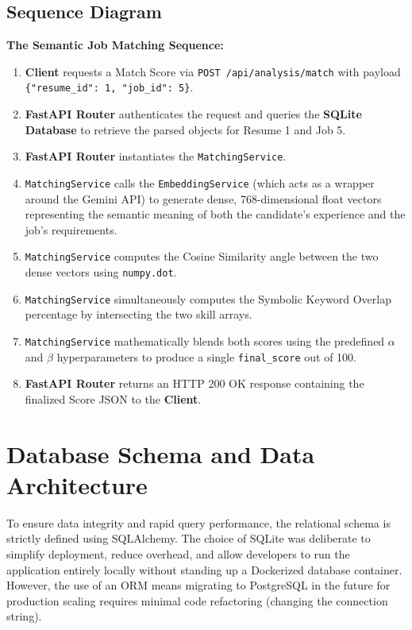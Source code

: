\documentclass[12pt,a4paper]{report}
\begin{document}
\subsection{Sequence Diagram}
\textbf{The Semantic Job Matching Sequence:}
\begin{enumerate}
    \item \textbf{Client} requests a Match Score via \texttt{POST /api/analysis/match} with payload \texttt{\{"resume\_id": 1, "job\_id": 5\}}.
    \item \textbf{FastAPI Router} authenticates the request and queries the \textbf{SQLite Database} to retrieve the parsed objects for Resume 1 and Job 5.
    \item \textbf{FastAPI Router} instantiates the \texttt{MatchingService}.
    \item \texttt{MatchingService} calls the \texttt{EmbeddingService} (which acts as a wrapper around the Gemini API) to generate dense, 768-dimensional float vectors representing the semantic meaning of both the candidate's experience and the job's requirements.
    \item \texttt{MatchingService} computes the Cosine Similarity angle between the two dense vectors using \texttt{numpy.dot}.
    \item \texttt{MatchingService} simultaneously computes the Symbolic Keyword Overlap percentage by intersecting the two skill arrays.
    \item \texttt{MatchingService} mathematically blends both scores using the predefined $\alpha$ and $\beta$ hyperparameters to produce a single \texttt{final\_score} out of 100.
    \item \textbf{FastAPI Router} returns an HTTP 200 OK response containing the finalized Score JSON to the \textbf{Client}.
\end{enumerate}

\section{Database Schema and Data Architecture}

To ensure data integrity and rapid query performance, the relational schema is strictly defined using SQLAlchemy. The choice of SQLite was deliberate to simplify deployment, reduce overhead, and allow developers to run the application entirely locally without standing up a Dockerized database container. However, the use of an ORM means migrating to PostgreSQL in the future for production scaling requires minimal code refactoring (changing the connection string).
\end{document}
